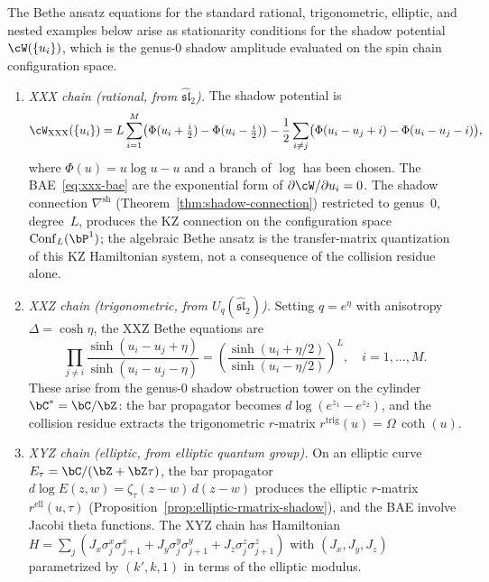 \begin{theorem}
\label{thm:bae-from-mc}
The Bethe ansatz equations for the standard rational, trigonometric,
elliptic, and nested examples below arise as stationarity conditions
for the shadow potential
$\cW(\{u_i\})$, which is the genus-$0$ shadow amplitude
evaluated on the spin chain configuration space.
\begin{enumerate}[label=\textup{(\roman*)}]
\item \emph{XXX chain \textup{(}rational, from $\hat{\mathfrak{sl}}_2$\textup{)}.}
	 The shadow potential is
	 \begin{equation}\label{eq:xxx-shadow-potential}
	 \cW_{\mathrm{XXX}}(\{u_i\})
	 = L\sum_{i=1}^{M}
	 \bigl(\Phi(u_i+\tfrac{i}{2})-\Phi(u_i-\tfrac{i}{2})\bigr)
	 -\frac12\sum_{i\ne j}
	 \bigl(\Phi(u_i-u_j+i)-\Phi(u_i-u_j-i)\bigr),
	 \end{equation}
	 where $\Phi(u) = u\log u - u$ and a branch of \(\log\) has been
	 chosen. The BAE~\eqref{eq:xxx-bae} are the exponential form of
	 \(\partial \cW/\partial u_i=0\). The shadow connection
 $\nabla^{\mathrm{sh}}$
 \textup{(}Theorem~\textup{\ref{thm:shadow-connection})}
 restricted to genus~$0$, degree~$L$, produces the KZ connection
 on the configuration space $\operatorname{Conf}_L(\bP^1)$;
 the algebraic Bethe ansatz is the transfer-matrix quantization of
 this KZ Hamiltonian system, not a consequence of the collision
 residue alone.

\item \emph{XXZ chain \textup{(}trigonometric, from $U_q(\hat{\mathfrak{sl}}_2)$\textup{)}.}
 Setting $q = e^\eta$ with anisotropy $\Delta = \cosh \eta$,
 the XXZ Bethe equations are
 \begin{equation}\label{eq:xxz-bae}
 \prod_{j \neq i}
 \frac{\sinh(u_i - u_j + \eta)}{\sinh(u_i - u_j - \eta)}
 = \left(
 \frac{\sinh(u_i + \eta/2)}{\sinh(u_i - \eta/2)}
 \right)^{\!L},
 \quad i = 1, \ldots, M.
 \end{equation}
 These arise from the genus-$0$ shadow obstruction tower on
 the cylinder $\bC^* = \bC / \bZ$: the bar propagator becomes
 $d\log(e^{z_1} - e^{z_2})$, and the collision residue extracts
 the trigonometric $r$-matrix
 $r^{\mathrm{trig}}(u) = \Omega\,\coth(u)$.

\item \emph{XYZ chain \textup{(}elliptic, from elliptic quantum group\textup{)}.}
 On an elliptic curve $E_\tau = \bC / (\bZ + \bZ\tau)$, the bar
 propagator $d\log E(z,w) = \zeta_\tau(z - w)\,d(z-w)$ produces
 the elliptic $r$-matrix
 $r^{\mathrm{ell}}(u, \tau)$
 \textup{(}Proposition~\textup{\ref{prop:elliptic-rmatrix-shadow}}\textup{)},
 and the BAE involve Jacobi theta functions. The XYZ chain
 has Hamiltonian
 $H = \sum_j (J_x \sigma_j^x \sigma_{j+1}^x
 + J_y \sigma_j^y \sigma_{j+1}^y
 + J_z \sigma_j^z \sigma_{j+1}^z)$
 with $(J_x, J_y, J_z)$ parametrized by $(k', k, 1)$
 in terms of the elliptic modulus.


\end{enumerate}
\end{theorem}
